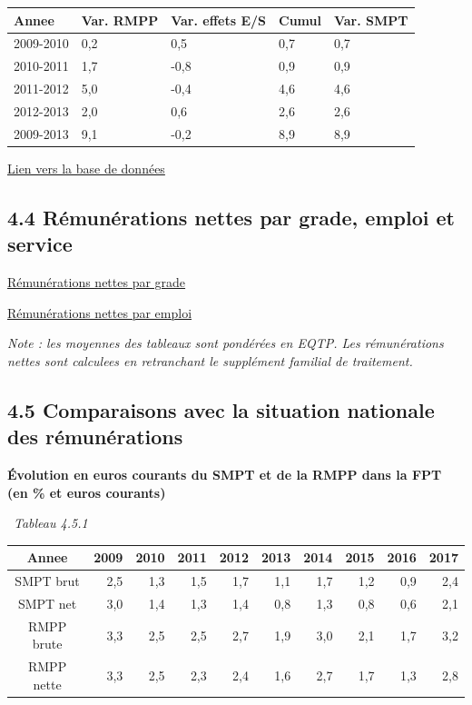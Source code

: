 \begin{longtable}[]{@{}lllll@{}}
\toprule
Annee & Var. RMPP & Var. effets E/S & Cumul & Var. SMPT\tabularnewline
\midrule
\endhead
2009-2010 & 0,2 & 0,5 & 0,7 & 0,7\tabularnewline
2010-2011 & 1,7 & -0,8 & 0,9 & 0,9\tabularnewline
2011-2012 & 5,0 & -0,4 & 4,6 & 4,6\tabularnewline
2012-2013 & 2,0 & 0,6 & 2,6 & 2,6\tabularnewline
2009-2013 & 9,1 & -0,2 & 8,9 & 8,9\tabularnewline
\bottomrule
\end{longtable}

\href{../Bases/Remunerations/Anavar.synthese.csv}{Lien vers la base de
données}

\hypertarget{remunerations-nettes-par-grade-emploi-et-service}{%
\subsection{4.4 Rémunérations nettes par grade, emploi et
service}\label{remunerations-nettes-par-grade-emploi-et-service}}

\href{../Bases/Remunerations/net.grades.csv}{Rémunérations nettes par
grade}

\href{../Bases/Remunerations/net.emplois.csv}{Rémunérations nettes par
emploi}

\emph{Note : les moyennes des tableaux sont pondérées en EQTP. Les
rémunérations nettes sont calculees en retranchant le supplément
familial de traitement.}

\hypertarget{comparaisons-avec-la-situation-nationale-des-remunerations}{%
\subsection{4.5 Comparaisons avec la situation nationale des
rémunérations}\label{comparaisons-avec-la-situation-nationale-des-remunerations}}

\textbf{Évolution en euros courants du SMPT et de la RMPP dans la FPT
(en \% et euros courants)}

~\emph{Tableau 4.5.1}

\begin{longtable}[]{@{}crrrrrrrrr@{}}
\toprule
Annee & 2009 & 2010 & 2011 & 2012 & 2013 & 2014 & 2015 & 2016 &
2017\tabularnewline
\midrule
\endhead
SMPT brut & 2,5 & 1,3 & 1,5 & 1,7 & 1,1 & 1,7 & 1,2 & 0,9 &
2,4\tabularnewline
SMPT net & 3,0 & 1,4 & 1,3 & 1,4 & 0,8 & 1,3 & 0,8 & 0,6 &
2,1\tabularnewline
RMPP brute & 3,3 & 2,5 & 2,5 & 2,7 & 1,9 & 3,0 & 2,1 & 1,7 &
3,2\tabularnewline
RMPP nette & 3,3 & 2,5 & 2,3 & 2,4 & 1,6 & 2,7 & 1,7 & 1,3 &
2,8\tabularnewline
\bottomrule
\end{longtable}

